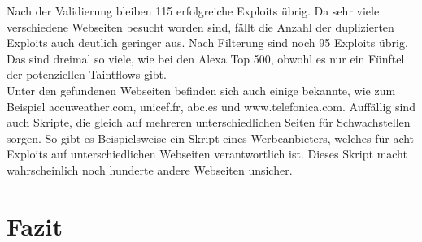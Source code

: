 Nach der Validierung bleiben 115 erfolgreiche Exploits übrig. Da sehr viele verschiedene Webseiten besucht worden sind, fällt die Anzahl der duplizierten Exploits auch deutlich geringer aus. Nach Filterung sind noch 95 Exploits übrig. Das sind dreimal so viele, wie bei den Alexa Top 500, obwohl es nur ein Fünftel der potenziellen Taintflows gibt. \\
Unter den gefundenen Webseiten befinden sich auch einige bekannte, wie zum Beispiel accuweather.com, unicef.fr, abc.es und www.telefonica.com. Auffällig sind auch Skripte, die gleich auf mehreren unterschiedlichen Seiten für Schwachstellen sorgen. So gibt es Beispielsweise ein Skript eines Werbeanbieters, welches für acht Exploits auf unterschiedlichen Webseiten verantwortlich ist. Dieses Skript macht wahrscheinlich noch hunderte andere Webseiten unsicher.

\chapter{Fazit}
